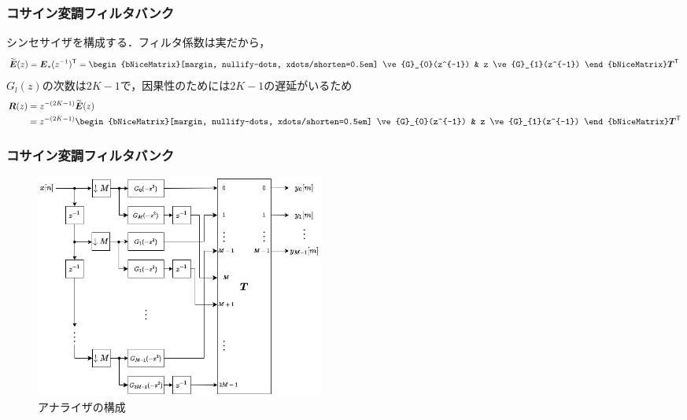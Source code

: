 \documentclass[14pt,xcolor=dvipsnames,table,dvipdfmx]{beamer}
\begin{document}
\begin{frame}[c]
    \frametitle{コサイン変調フィルタバンク}
    シンセサイザを構成する．フィルタ係数は実だから，
    \begin{align}
        \widetilde{\ve{E}}(z) = \ve{E}_{\ast}(z^{-1})^{\mathsf{T}} =
        \begin{bNiceMatrix}[margin, nullify-dots, xdots/shorten=0.5em]
            \ve{G}_{0}(z^{-1}) & z \ve{G}_{1}(z^{-1})
        \end{bNiceMatrix}
        \ve{T}^{\mathsf{T}}
    \end{align}
    $G_{l}(z)$の次数は$2K - 1$で，因果性のためには$2K - 1$の遅延がいるため
    \begin{align}
        \ve{R}(z) &= z^{-(2K-1)} \widetilde{\ve{E}}(z) \nonumber \\
        &=
        z^{-(2K-1)}
        \begin{bNiceMatrix}[margin, nullify-dots, xdots/shorten=0.5em]
            \ve{G}_{0}(z^{-1}) & z \ve{G}_{1}(z^{-1})
        \end{bNiceMatrix}
        \ve{T}^{\mathsf{T}} \label{eq:synthesizer_matrix_of_cos_modulated_filter_bank}
    \end{align}
\end{frame}

\begin{frame}[c]
    \frametitle{コサイン変調フィルタバンク}
    \begin{figure}
        \includegraphics[width=95mm]{./figs/cos_modulated_analysis_bank_filter.drawio.png}
        \caption*{アナライザの構成}
    \end{figure}
\end{frame}
\end{document}
